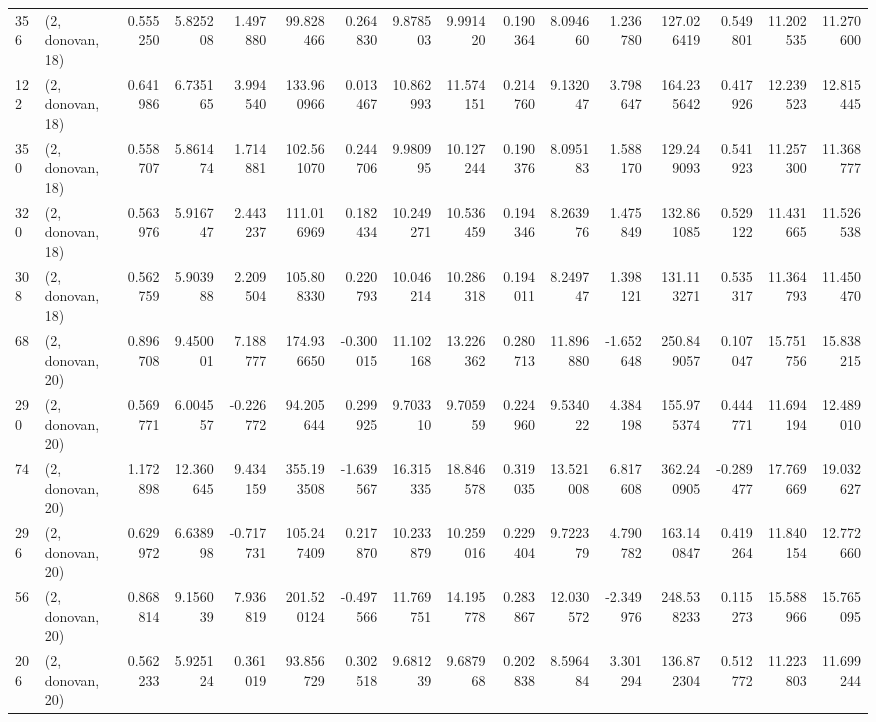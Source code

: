 \begin{tabular}{llrrrrrrrrrrrrrr}
356 &  (2, donovan, 18) &   0.555250 &   5.825208 &   1.497880 &    99.828466 &   0.264830 &   9.878503 &   9.991420 &  0.190364 &   8.094660 &   1.236780 &   127.026419 &  0.549801 &  11.202535 &  11.270600 \\
122 &  (2, donovan, 18) &   0.641986 &   6.735165 &   3.994540 &   133.960966 &   0.013467 &  10.862993 &  11.574151 &  0.214760 &   9.132047 &   3.798647 &   164.235642 &  0.417926 &  12.239523 &  12.815445 \\
350 &  (2, donovan, 18) &   0.558707 &   5.861474 &   1.714881 &   102.561070 &   0.244706 &   9.980995 &  10.127244 &  0.190376 &   8.095183 &   1.588170 &   129.249093 &  0.541923 &  11.257300 &  11.368777 \\
320 &  (2, donovan, 18) &   0.563976 &   5.916747 &   2.443237 &   111.016969 &   0.182434 &  10.249271 &  10.536459 &  0.194346 &   8.263976 &   1.475849 &   132.861085 &  0.529122 &  11.431665 &  11.526538 \\
308 &  (2, donovan, 18) &   0.562759 &   5.903988 &   2.209504 &   105.808330 &   0.220793 &  10.046214 &  10.286318 &  0.194011 &   8.249747 &   1.398121 &   131.113271 &  0.535317 &  11.364793 &  11.450470 \\
68  &  (2, donovan, 20) &   0.896708 &   9.450001 &   7.188777 &   174.936650 &  -0.300015 &  11.102168 &  13.226362 &  0.280713 &  11.896880 &  -1.652648 &   250.849057 &  0.107047 &  15.751756 &  15.838215 \\
290 &  (2, donovan, 20) &   0.569771 &   6.004557 &  -0.226772 &    94.205644 &   0.299925 &   9.703310 &   9.705959 &  0.224960 &   9.534022 &   4.384198 &   155.975374 &  0.444771 &  11.694194 &  12.489010 \\
74  &  (2, donovan, 20) &   1.172898 &  12.360645 &   9.434159 &   355.193508 &  -1.639567 &  16.315335 &  18.846578 &  0.319035 &  13.521008 &   6.817608 &   362.240905 & -0.289477 &  17.769669 &  19.032627 \\
296 &  (2, donovan, 20) &   0.629972 &   6.638998 &  -0.717731 &   105.247409 &   0.217870 &  10.233879 &  10.259016 &  0.229404 &   9.722379 &   4.790782 &   163.140847 &  0.419264 &  11.840154 &  12.772660 \\
56  &  (2, donovan, 20) &   0.868814 &   9.156039 &   7.936819 &   201.520124 &  -0.497566 &  11.769751 &  14.195778 &  0.283867 &  12.030572 &  -2.349976 &   248.538233 &  0.115273 &  15.588966 &  15.765095 \\
206 &  (2, donovan, 20) &   0.562233 &   5.925124 &   0.361019 &    93.856729 &   0.302518 &   9.681239 &   9.687968 &  0.202838 &   8.596484 &   3.301294 &   136.872304 &  0.512772 &  11.223803 &  11.699244 \\

\end{tabular}
